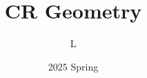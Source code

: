 \documentclass[openany, a4paper,12pt]{book}
\begin{document}
\title{CR Geometry}
\author{L}
\date{2025 Spring}
\maketitle




\tableofcontents









 
 
\end{document}
